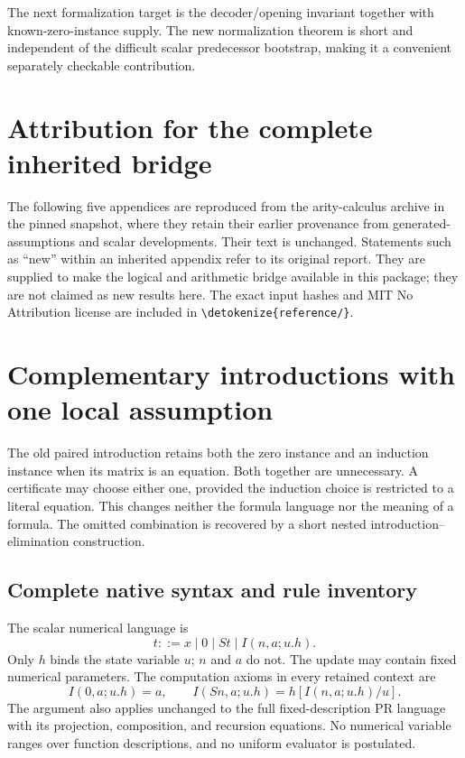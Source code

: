 \documentclass[11pt,letterpaper]{article}
\theoremstyle{definition}\newtheorem{definition}[theorem]{Definition}
\theoremstyle{remark}\newtheorem{remark}[theorem]{Remark}
\newcommand{\file}[1]{\expandafter\nolinkurl\expandafter{\detokenize{#1}}}
\begin{document}
The next formalization target is the decoder/opening invariant together
with known-zero-instance supply. The new normalization theorem is short
and independent of the difficult scalar predecessor bootstrap, making it
a convenient separately checkable contribution.

\clearpage
\appendix
\section{Attribution for the complete inherited bridge}

The following five appendices are reproduced from the arity-calculus
archive in the pinned snapshot, where they retain their earlier
provenance from generated-assumptions and scalar developments. Their
text is unchanged. Statements such as ``new'' within an inherited
appendix refer to its original report. They are supplied to make the
logical and arithmetic bridge available in this package; they are not
claimed as new results here. The exact input hashes and MIT No Attribution
license are included in \file{reference/}.



\section{Complementary introductions with one local assumption}
\label{sec:choice-introduction}

The old paired introduction retains both the zero instance and an
induction instance when its matrix is an equation. Both together are
unnecessary. A certificate may choose either one, provided the induction
choice is restricted to a literal equation. This changes neither the
formula language nor the meaning of a formula. The omitted combination
is recovered by a short nested introduction--elimination construction.

\subsection{Complete native syntax and rule inventory}

The scalar numerical language is
\[
 t::=x\mid0\mid St\mid I(n,a;u.h).
\]
Only $h$ binds the state variable $u$; $n$ and $a$ do not.
The update may contain fixed numerical parameters. The computation
axioms in every retained context are
\[
 I(0,a;u.h)=a,\qquad
 I(Sn,a;u.h)=h[I(n,a;u.h)/u].
 \tag{I0, IS}\label{eq:choice-computations}
\]
The argument also applies unchanged to the full fixed-description PR
language with its projection, composition, and recursion equations.
No numerical variable ranges over function descriptions, and no uniform
evaluator is postulated.
\end{document}
